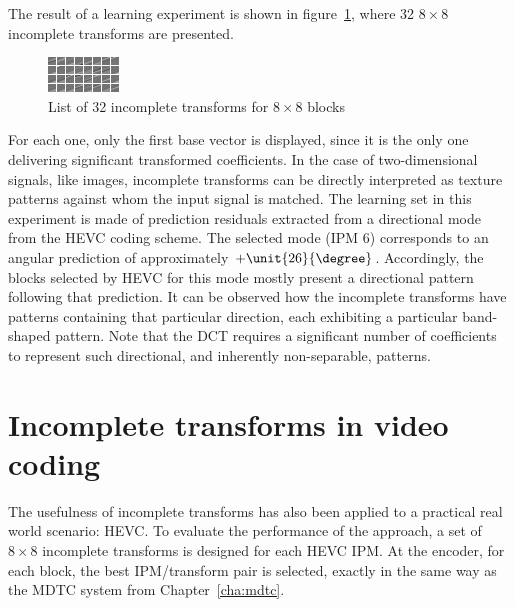 \documentclass[11pt,a4paper,openright,twoside]{book}
\numberwithin{equation}{section} %
\numberwithin{figure}{section} %
\numberwithin{table}{section} %
\begin{document}
The result of a learning experiment is shown in
figure~\ref{fig:it_32_transforms}, where 32 $8\times8$ incomplete transforms
are presented.
\begin{figure}[tp]
	\centering
	\includegraphics[width=0.8\linewidth]{./figures/it_32_transforms.png}
	\caption{List of 32 incomplete transforms for $8\times8$ blocks}
	\label{fig:it_32_transforms}
\end{figure}
For each one, only the first base vector is displayed, since it is the only
one delivering significant transformed coefficients.
In the case of two-dimensional signals, like images, incomplete transforms can
be directly interpreted as texture patterns against whom the input signal is
matched.
The learning set in this experiment is made of prediction residuals extracted
from a directional mode from the \ac{HEVC} coding scheme.
The selected mode (\ac{IPM} 6) corresponds to an angular prediction of
approximately $+\unit{26}{\degree}$.
Accordingly, the blocks selected by \ac{HEVC} for this mode mostly present a
directional pattern following that prediction.
It can be observed how the incomplete transforms have patterns containing that
particular direction, each exhibiting a particular band-shaped pattern.
Note that the \ac{DCT} requires a significant number of coefficients to
represent such directional, and inherently non-separable, patterns.

\section{Incomplete transforms in video coding}
\label{sec:it_video_coding}

The usefulness of incomplete transforms has also been applied to a practical
real world scenario: \ac{HEVC}.
To evaluate the performance of the approach, a set of $8\times8$ incomplete
transforms is designed for each \ac{HEVC} \ac{IPM}.
At the encoder, for each block, the best \ac{IPM}/transform pair is selected,
exactly in the same way as the \ac{MDTC} system from Chapter~\ref{cha:mdtc}.
\end{document}
